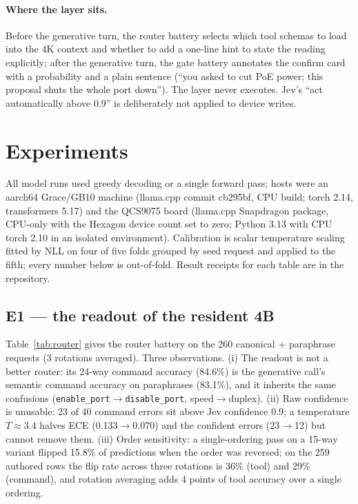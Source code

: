 \documentclass[11pt]{article}
\begin{document}
\paragraph{Where the layer sits.} Before the generative turn, the router battery selects which
tool schemas to load into the 4K context and whether to add a one-line hint to state the
reading explicitly; after the generative turn, the gate battery annotates the confirm card with
a probability and a plain sentence (``you asked to cut PoE power; this proposal shuts the whole
port down''). The layer never executes. Jev's ``act automatically above 0.9'' is deliberately not
applied to device writes.

\section{Experiments}
\label{sec:experiments}

All model runs used greedy decoding or a single forward pass; hosts were an aarch64
Grace/GB10 machine (llama.cpp commit cb295bf, CPU build; torch 2.14, transformers 5.17) and the
QCS9075 board (llama.cpp Snapdragon package, CPU-only with the Hexagon device count set to zero;
Python 3.13 with CPU torch 2.10 in an isolated environment). Calibration is scalar temperature
scaling fitted by NLL on four of five folds grouped by seed request and applied to the fifth;
every number below is out-of-fold. Result receipts for each table are in the repository.

\subsection{E1 --- the readout of the resident 4B}

Table~\ref{tab:router} gives the router battery on the 260 canonical + paraphrase requests
(3 rotations averaged). Three observations. (i) The readout is not a better router: its 24-way
command accuracy (84.6\%) is the generative call's semantic command accuracy on paraphrases
(83.1\%), and it inherits the same confusions (\texttt{enable\_port}$\to$\texttt{disable\_port},
speed$\to$duplex). (ii) Raw confidence is unusable: 23 of 40 command errors sit above Jev
confidence 0.9; a temperature $T\approx3.4$ halves ECE (0.133$\to$0.070) and the confident errors
(23$\to$12) but cannot remove them. (iii) Order sensitivity: a single-ordering pass on a 15-way
variant flipped 15.8\% of predictions when the order was reversed; on the 259 authored rows the
flip rate across three rotations is 36\% (tool) and 29\% (command), and rotation averaging adds
4 points of tool accuracy over a single ordering.
\end{document}

